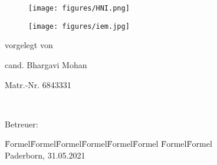 
\begin{titlepage}
\begin{figure}[htb]
\centering
\begin{addmargin*}[0cm]{0cm} %
\begin{minipage}[b]{0.5\textwidth} %
\flushleft
  \texttt{[image: figures/HNI.png]}
\end{minipage}
\hspace{.01\linewidth}
\begin{minipage}[b]{.5\textwidth}
\begin{addmargin*}[0cm]{-0.5cm} %
\flushright
  \texttt{[image: figures/iem.jpg]}
\end{addmargin*}
 \end{minipage}
\end{addmargin*}

 \end{figure}
\sffamily

\vspace*{3.5cm}
\fontsize{24pt}{26pt}\selectfont
\begin{center}
\textbf{\ausarbeitungsTyp}


\Large
\textbf{\meinTitel}
\vspace*{3cm}

\normalsize
vorgelegt von
\vspace*{0.5cm}

cand. Bhargavi Mohan

Matr.-Nr. 6843331 
\vspace*{1.5cm}

\large
\textbf{~}
\end{center}
\vspace*{2cm}
\normalsize
Betreuer:

\begin{tabbing}
\quad\=Formel\quad\= Formel\quad\= Formel\quad\= Formel\quad\= Formel\quad\= Formel \quad\= Formel\quad\= Formel\kill  
\meinErstgutachter\\
\meinZweitgutachter \>\>\>\>\>\>\> Paderborn, 31.05.2021
\end{tabbing}
\normalsize
\vfill
\newpage
\thispagestyle{empty}    %
\vspace*{16.5cm}


\end{titlepage}
